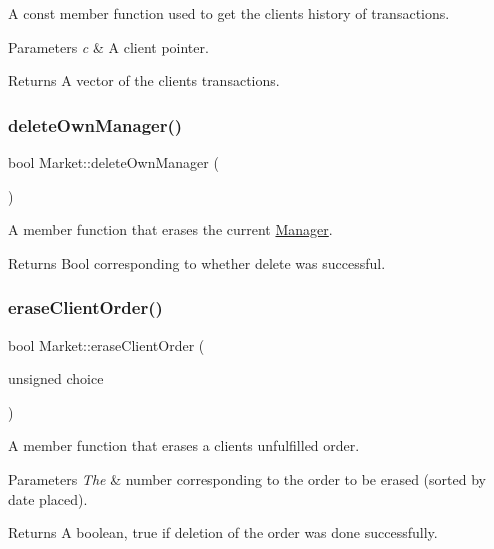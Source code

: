 A const member function used to get the client\textquotesingle{}s history of transactions. 
\begin{DoxyParams}{Parameters}
{\em c} & A client pointer. \\
\hline
\end{DoxyParams}
\begin{DoxyReturn}{Returns}
A vector of the client\textquotesingle{}s transactions. 
\end{DoxyReturn}
\hypertarget{class_market_ab2b282d3a7f73a5e71b54a5367e85d12}{}\label{class_market_ab2b282d3a7f73a5e71b54a5367e85d12} 
\subsubsection{\texorpdfstring{delete\+Own\+Manager()}{deleteOwnManager()}}
{\footnotesize\ttfamily bool Market\+::delete\+Own\+Manager (\begin{DoxyParamCaption}{ }\end{DoxyParamCaption})}

A member function that erases the current \hyperlink{class_manager}{Manager}. \begin{DoxyReturn}{Returns}
Bool corresponding to whether delete was successful. 
\end{DoxyReturn}
\hypertarget{class_market_a84df7da0cc63a1ff6d22e467e5060758}{}\label{class_market_a84df7da0cc63a1ff6d22e467e5060758} 
\subsubsection{\texorpdfstring{erase\+Client\+Order()}{eraseClientOrder()}}
{\footnotesize\ttfamily bool Market\+::erase\+Client\+Order (\begin{DoxyParamCaption}\item[{unsigned}]{choice }\end{DoxyParamCaption})}

A member function that erases a client\textquotesingle{}s unfulfilled order. 
\begin{DoxyParams}{Parameters}
{\em The} & number corresponding to the order to be erased (sorted by date placed). \\
\hline
\end{DoxyParams}
\begin{DoxyReturn}{Returns}
A boolean, true if deletion of the order was done successfully. 
\end{DoxyReturn}
\hypertarget{class_market_ab185568375c98363c52da328f926dfd8}{}\label{class_market_ab185568375c98363c52da328f926dfd8} 
